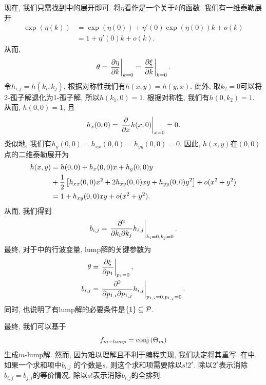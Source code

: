 现在, 我们只需找到中的展开即可. 将$\eta$看作是一个关于$k$的函数, 我们有一维泰勒展开  
\begin{equation}
\begin{split}
\exp(\eta(k))&=\exp(\eta(0))+\eta'(0)\exp(\eta(0))k+o(k)\\ 
&=1+\eta'(0)k+o(k). 
\end{split}
\end{equation}
从而, 
\begin{equation}
\theta=\left.{\frac{\partial \eta}{\partial k}}\right|_{k=0}=\left.{\frac{\partial \xi}{\partial k}}\right|_{k=0}.
\end{equation}
令$h_{i,j}=h(k_i,k_j)$, 根据对称性我们有$h(x,y)=h(y,x)$. 此外, 取$k_2=0$可以将2-孤子解退化为1-孤子解, 所以$h(k_1,0)=1$. 根据对称性, 我们有$h(0,k_2)=1$. 从而, $h(0,0)=1$, 且
\begin{equation}
    h_x(0,0)=\left.{\frac{\partial}{\partial x}h(x,0)}\right|_{x=0}=0.
\end{equation}
类似地, 我们有$h_y(0,0)=h_{xx}(0,0)=h_{yy}(0,0)=0$. 因此, $h(x,y)$在$(0,0)$点的二维泰勒展开为 
\begin{equation}
\begin{split}
h(x,y)&=h(0,0)+h_x(0,0)x+h_y(0,0)y \\ 
&+\frac{1}{2}\left[h_{xx}(0,0)x^2+2h_{xy}(0,0)xy+h_{yy}(0,0)y^2\right]+o(x^2+y^2) \\ 
&=1+h_{xy}(0,0)xy+o(x^2+y^2).
\end{split}
\end{equation}
从而, 我们得到
\begin{equation}
    b_{i,j}=\left.{\frac{\partial^2}{\partial k_i\partial k_j}h_{i,j}}\right|_{k_i=0,k_j=0}.
\end{equation}
最终, 对于中的行波变量, lump解的关键参数为
\begin{equation}
\begin{split}
    \theta &= \left.{\frac{\partial \xi}{\partial p_1}}\right|_{p_1=0}, \\
    b_{i,j}&= \left.{\frac{\partial^2}{\partial p_{1,i}\partial p_{1,j}}h_{i,j}}\right|_{p_{1,i}=0,p_{1,j}=0}.
\end{split} \label{p-lump}
\end{equation}
同时, 也说明了有lump解的必要条件是$\left\{1\right\}\subseteq \mathcal{P}$.

最终, 我们可以基于
\begin{equation}
    f_{m-lump}={\rm conj}\left(\Theta_m\right)
\end{equation}
生成$m$-lump解. 然而, 因为难以理解且不利于编程实现, 我们决定将其重写. 在中, 如果一个求和项中$b_{i,j}$ 的个数是$s$, 则这个求和项需要除以$s!2^s$. 除以$2^s$表示消除$b_{i,j}=b_{j,i}$的等价情况. 除以$s!$表示消除$b_{i,j}$的全排列.  

